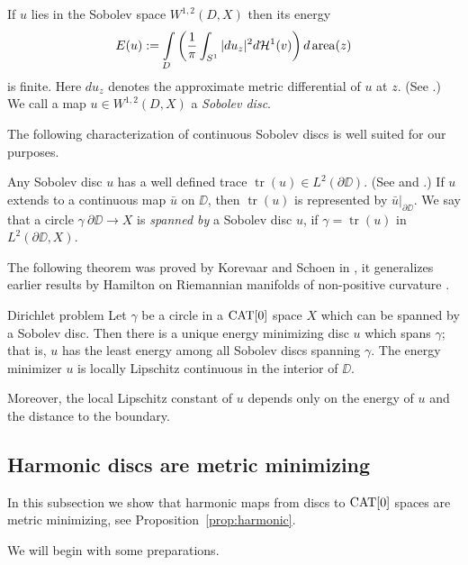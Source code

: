 \documentclass[a4paper,10pt]{amsart}
\begin{document}
If $u$ lies in the Sobolev space $W^{1,2}(D,X)$ then its energy 
\[E(u):=\int\limits_{D}\left(\frac{1}{\pi}\int_{S^1}|du_z|^2 d\mathcal{H}^1(v)\right) d\mathop{\rm area}\nolimits(z)\]
is finite. Here $du_z$ denotes the approximate metric differential of $u$ at $z$. (See \cite{LW}.)
We call a map $u\in W^{1,2}(D,X)$ a {\em Sobolev disc}.

The following characterization of continuous Sobolev discs is well suited for our purposes.












Any Sobolev disc $u$ has a well defined trace $\operatorname{tr}(u)\in L^2(\partial\DD)$. (See \cite{KS} and \cite{LW}.)
If $u$ extends to a continuous map $\bar u$ on $\DD$, then $\operatorname{tr}(u)$ is represented by $\bar u|_{\partial\DD}$. 
We say that a circle $\gamma\:\partial\DD\to X$ is {\em spanned by} a Sobolev disc $u$, if $\gamma=\operatorname{tr}(u)$ in $L^2(\partial\DD,X)$.


The following theorem was proved by Korevaar and Schoen in \cite{KS}, it generalizes earlier results by Hamilton on Riemannian manifolds of non-positive
curvature \cite{H}.

\begin{thm}{Dirichlet problem}\label{thm:dirichlet}
Let $\gamma$ be a circle in a $\mathop{\rm CAT}\nolimits[0]$ space $X$ which can be spanned by a Sobolev disc. 
Then there is a unique energy minimizing disc $u$ which spans $\gamma$; 
that is, $u$
has the least energy among all Sobolev discs spanning $\gamma$. 
The energy minimizer $u$ is locally Lipschitz continuous in the interior of $\DD$.

Moreover, the local Lipschitz constant of $u$ depends only on the energy of $u$ and the distance to the boundary.
\end{thm}




\subsection{Harmonic discs are metric minimizing}

In this subsection we show that harmonic maps from discs to $\mathop{\rm CAT}\nolimits[0]$ spaces are metric minimizing, see Proposition~\ref{prop:harmonic}.





We will begin with some preparations. 
\end{document}
